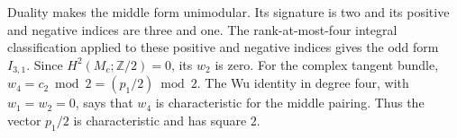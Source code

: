 \item Duality makes the middle form unimodular.  Its signature is two and
its positive and negative indices are three and one.  The rank-at-most-four integral classification
\cite[Theorem 2.2.1, p.~61]{ffPetersSterk} applied to these
positive and negative indices gives the odd form \(I_{3,1}\).
Since $H^2(M_c;\mathbb Z/2)=0$, its $w_2$ is zero.
For the complex tangent bundle,
$w_4=c_2\bmod2=(p_1/2)\bmod2$.
The Wu identity in degree four, with $w_1=w_2=0$, says that $w_4$ is
characteristic for the middle pairing.  Thus the vector $p_1/2$ is
characteristic and has square $2$.

